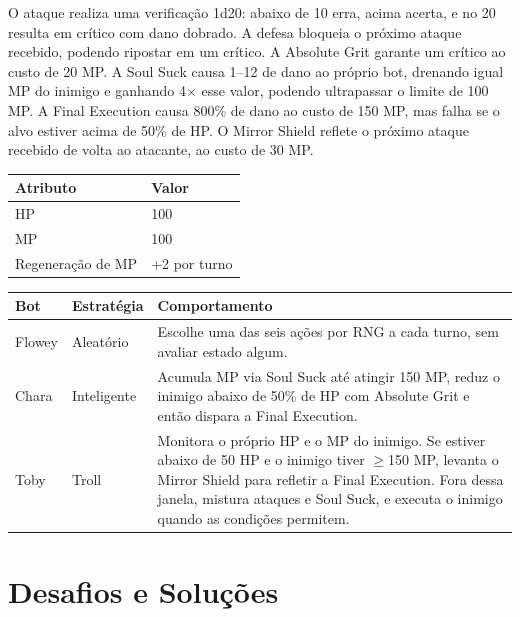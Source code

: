 \documentclass[AMA,twocolumn]{USG}
\begin{document}
O ataque realiza uma verificação 1d20: abaixo de 10 erra, acima acerta, e no 20 resulta em crítico com dano dobrado.
A defesa bloqueia o próximo ataque recebido, podendo ripostar em um crítico.
A Absolute Grit garante um crítico ao custo de 20 MP.
A Soul Suck causa 1--12 de dano ao próprio bot, drenando igual MP do inimigo e ganhando 4$\times$ esse valor, podendo ultrapassar o limite de 100 MP.
A Final Execution causa 800\% de dano ao custo de 150 MP, mas falha se o alvo estiver acima de 50\% de HP.
O Mirror Shield reflete o próximo ataque recebido de volta ao atacante, ao custo de 30 MP.

\vspace{4pt}\noindent{}
{\renewcommand{\arraystretch}{1.5}
\begin{tabular}{ll}
\hline
\textbf{Atributo} & \textbf{Valor} \\
\hline
HP & 100 \\
MP & 100 \\
Regeneração de MP & +2 por turno \\
\hline
\end{tabular}}
\vspace{4pt}



\vspace{4pt}\noindent{}
{\renewcommand{\arraystretch}{1.5}
\begin{tabular}{p{1.2cm}p{1.4cm}p{4.5cm}}
\hline
\textbf{Bot} & \textbf{Estratégia} & \textbf{Comportamento} \\
\hline
Flowey & Aleatório  & Escolhe uma das seis ações por RNG a cada turno, sem avaliar estado algum. \\
Chara  & Inteligente & Acumula MP via Soul Suck até atingir 150 MP, reduz o inimigo abaixo de 50\% de HP com Absolute Grit e então dispara a Final Execution. \\
Toby   & Troll    & Monitora o próprio HP e o MP do inimigo. Se estiver abaixo de 50 HP e o inimigo tiver $\geq$150 MP, levanta o Mirror Shield para refletir a Final Execution. Fora dessa janela, mistura ataques e Soul Suck, e executa o inimigo quando as condições permitem. \\
\hline
\end{tabular}}
\vspace{4pt}


\section{Desafios e Soluções}
\end{document}

